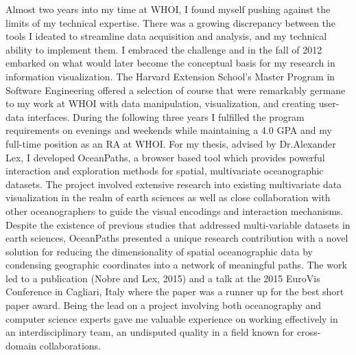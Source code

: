 \documentclass[timesfont,runinheadings]{nsfgrfp}
\begin{document}
Almost two years into my time at WHOI, I found myself pushing against the limits of my technical expertise. There was a growing discrepancy between the tools I ideated to streamline data acquisition and analysis, and my technical ability to implement them. I embraced the challenge and in the fall of 2012 embarked on what would later become the conceptual basis for my research in information visualization. The Harvard Extension School’s Master Program in Software Engineering offered a selection of course that were remarkably germane to my work at WHOI with data manipulation, visualization, and creating user-data interfaces. During the following three years I fulfilled the program requirements on evenings and weekends while maintaining a 4.0 GPA and my full-time position as an RA at WHOI. For my thesis, advised by Dr.Alexander Lex, I developed OceanPaths, a browser based tool which provides powerful interaction and exploration methods for spatial, multivariate oceanographic datasets. The project involved extensive research into existing multivariate data visualization in the realm of earth sciences as well as close collaboration with other oceanographers to guide the visual encodings and interaction mechanisms. Despite the existence of previous studies that addressed multi-variable datasets in earth sciences, OceanPaths presented a unique research contribution with a novel solution for reducing the dimensionality of spatial oceanographic data by condensing geographic coordinates into a network of meaningful paths. The work led to a publication (Nobre and Lex, 2015) and a talk at the 2015 EuroVis Conference in Cagliari, Italy where the paper was a runner up for the best short paper award. Being the lead on a project involving both oceanography and computer science experts gave me valuable experience on working effectively in an interdisciplinary team, an undisputed quality in a field known for cross-domain collaborations.
\end{document}

